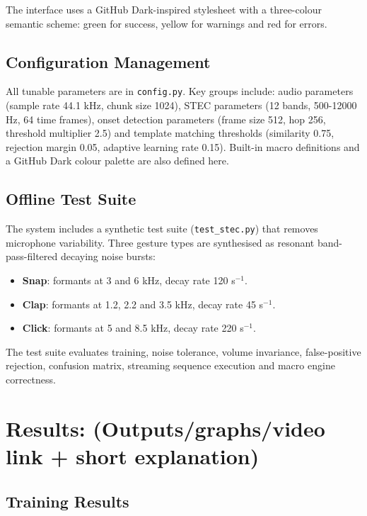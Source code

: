 \documentclass[12pt,a4paper]{article}
\begin{document}
The interface uses a GitHub Dark-inspired stylesheet with a three-colour semantic scheme: green for success, yellow for warnings and red for errors.

\subsection{Configuration Management}

All tunable parameters are in \texttt{config.py}. Key groups include: audio parameters (sample rate 44.1 kHz, chunk size 1024), STEC parameters (12 bands, 500-12000 Hz, 64 time frames), onset detection parameters (frame size 512, hop 256, threshold multiplier 2.5) and template matching thresholds (similarity 0.75, rejection margin 0.05, adaptive learning rate 0.15). Built-in macro definitions and a GitHub Dark colour palette are also defined here.

\subsection{Offline Test Suite}

The system includes a synthetic test suite (\texttt{test\_stec.py}) that removes microphone variability. Three gesture types are synthesised as resonant band-pass-filtered decaying noise bursts:

\begin{itemize}
    \item \textbf{Snap}: formants at 3 and 6 kHz, decay rate 120 s\(^{-1}\).
    \item \textbf{Clap}: formants at 1.2, 2.2 and 3.5 kHz, decay rate 45 s\(^{-1}\).
    \item \textbf{Click}: formants at 5 and 8.5 kHz, decay rate 220 s\(^{-1}\).
\end{itemize}

The test suite evaluates training, noise tolerance, volume invariance, false-positive rejection, confusion matrix, streaming sequence execution and macro engine correctness.

\section{Results: (Outputs/graphs/video link + short explanation)}

\subsection{Training Results}
\end{document}
